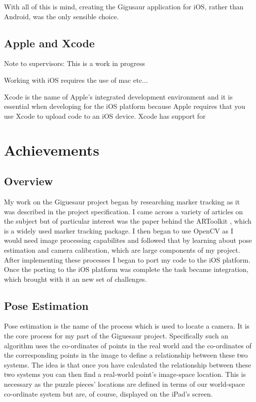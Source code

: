 \documentclass{article}
\begin{document}
With all of this is mind, creating the Gigusaur application for iOS, rather than Android, was the only sensible choice. 

\subsection{Apple and Xcode}

Note to supervisors: This is a work in progress

Working with iOS requires the use of mac etc...

Xcode is the name of Apple's integrated development environment and it is essential when developing for the iOS platform because Apple requires that you use Xcode to upload code to an iOS device. Xcode has support for 

\section{Achievements}

\subsection{Overview}

My work on the Giguesaur project began by researching marker tracking as it was described in the project specification. I came across a variety of articles on the subject but of particular interest was the paper behind the ARToolkit \cite{artoolkit}, which is a widely used marker tracking package. I then began to use OpenCV as I would need image processing capabilites and followed that by learning about pose estimation and camera calibration, which are large components of my project. After implementing these processes I began to port my code to the iOS platform. Once the porting to the iOS platform was complete the task became integration, which brought with it an new set of challenges. 

\subsection{Pose Estimation}

Pose estimation is the name of the process which is used to locate a camera. It is the core process for my part of the Giguesaur project. Specifically such an algorithm uses the co-ordinates of points in the real world and the co-ordinates of the corresponding points in the image to define a relationship between these two systems. The idea is that once you have calculated the relationship between these two systems you can then find a real-world point's image-space location. This is necessary as the puzzle pieces' locations are defined in terms of our world-space co-ordinate system but are, of course, displayed on the iPad's screen. 
\end{document}
